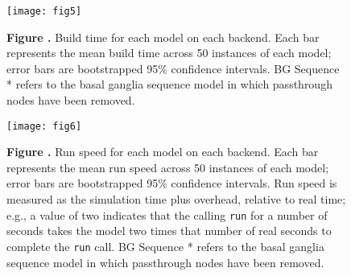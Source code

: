 \documentclass{frontiersSCNS}
\begin{document}
\begin{figure}[!ht]
\begin{center}
  \texttt{[image: fig5]}
\end{center}
\textbf{\label{fig:05} Figure .}
       {Build time for each model on each backend. Each bar represents
         the mean build time across 50 instances of each model;
         error bars are bootstrapped 95\% confidence intervals.
         BG Sequence * refers to the basal ganglia sequence model
         in which passthrough nodes have been removed.}
\end{figure}

\begin{figure}[!ht]
\begin{center}
  \texttt{[image: fig6]}
\end{center}
\textbf{\label{fig:06} Figure .}
       {Run speed for each model on each backend. Each bar represents
         the mean run speed across 50 instances of each model;
         error bars are bootstrapped 95\% confidence intervals.
         Run speed is measured as the simulation time plus overhead,
         relative to real time; e.g., a value of two indicates that
         the calling \texttt{run} for a number of seconds takes
         the model two times that number of real seconds to complete the
         \texttt{run} call.
         BG Sequence * refers to the basal ganglia sequence model
         in which passthrough nodes have been removed.}

\end{figure}
\end{document}
